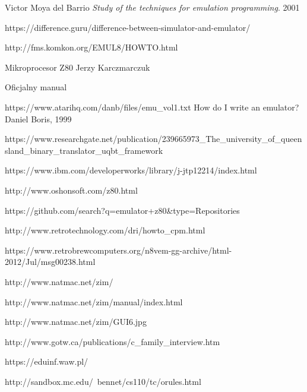 \documentclass[12pt,a4paper]{report}
\begin{document}
	
	\begin{thebibliography}{9}
		Victor Moya del Barrio
		\emph{Study of the techniques for emulation programming}.
		2001
		
		https://difference.guru/difference-between-simulator-and-emulator/
		
		http://fms.komkon.org/EMUL8/HOWTO.html
		
		Mikroprocesor Z80 Jerzy Karczmarczuk
		
		Oficjalny manual
		
		 https://www.atarihq.com/danb/files/emu\_vol1.txt
		How do I write an emulator? Daniel Boris, 1999
		
		https://www.researchgate.net/publication/239665973\_The\_university\_of\_queensland\_binary\_translator\_uqbt\_framework
		
		https://www.ibm.com/developerworks/library/j-jtp12214/index.html
		
		http://www.oshonsoft.com/z80.html
		
		https://github.com/search?q=emulator+z80\&type=Repositories
		
		http://www.retrotechnology.com/dri/howto\_cpm.html
		
		https://www.retrobrewcomputers.org/n8vem-gg-archive/html-2012/Jul/msg00238.html

		http://www.natmac.net/zim/
		
		http://www.natmac.net/zim/manual/index.html
		
		http://www.natmac.net/zim/GUI6.jpg
		
		http://www.gotw.ca/publications/c\_family\_interview.htm
		
		https://eduinf.waw.pl/
		
		http://sandbox.mc.edu/~bennet/cs110/tc/orules.html
				
	\end{thebibliography}
	
\end{document}
